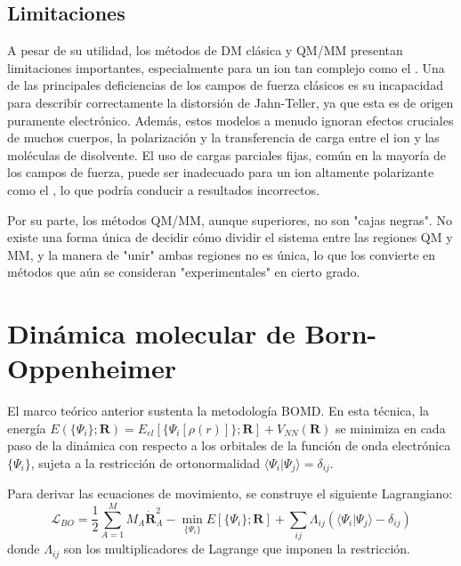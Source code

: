 \subsection{Limitaciones}
A pesar de su utilidad, los métodos de DM clásica y QM/MM presentan limitaciones importantes, especialmente para un ion tan complejo como el . Una de las principales deficiencias de los campos de fuerza clásicos es su incapacidad para describir correctamente la distorsión de Jahn-Teller, ya que esta es de origen puramente electrónico. Además, estos modelos a menudo ignoran efectos cruciales de muchos cuerpos, la polarización y la transferencia de carga entre el ion y las moléculas de disolvente. El uso de cargas parciales fijas, común en la mayoría de los campos de fuerza, puede ser inadecuado para un ion altamente polarizante como el , lo que podría conducir a resultados incorrectos.

Por su parte, los métodos QM/MM, aunque superiores, no son "cajas negras". No existe una forma única de decidir cómo dividir el sistema entre las regiones QM y MM, y la manera de "unir" ambas regiones no es única, lo que los convierte en métodos que aún se consideran "experimentales" en cierto grado.




\section{Dinámica molecular de Born-Oppenheimer} 

El marco teórico anterior sustenta la metodología BOMD. En esta técnica, la energía $E(\{\Psi_i\}; \mathbf{R}) = E_{el}[\{\Psi_i[\rho(r)]\};\mathbf{R}] + V_{NN}(\mathbf{R})$ se minimiza en cada paso de la dinámica con respecto a los orbitales de la función de onda electrónica $\{\Psi_i\}$, sujeta a la restricción de ortonormalidad $\langle\Psi_i|\Psi_j\rangle = \delta_{ij}$.

Para derivar las ecuaciones de movimiento, se construye el siguiente Lagrangiano:
\begin{equation}
    \mathcal{L}_{BO} = \frac{1}{2} \sum_{A=1}^{M} M_A \dot{\mathbf{R}}_A^2 - \min_{\{\Psi_i\}} E[\{\Psi_i\};\mathbf{R}] + \sum_{ij} \Lambda_{ij} (\langle\Psi_i|\Psi_j\rangle - \delta_{ij})
    \label{eq:lagrangiano_bo} 
\end{equation}
donde $\Lambda_{ij}$ son los multiplicadores de Lagrange que imponen la restricción.

